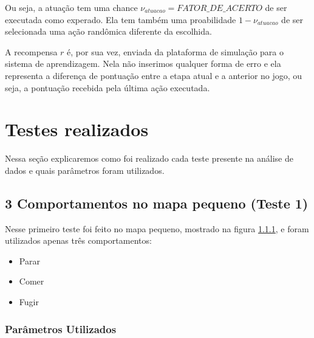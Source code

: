 Ou seja, a atuação tem uma chance $ \nu_{atuacao} = \textit{FATOR\_DE\_ACERTO} $ de ser executada como experado. Ela tem também uma proabilidade $ 1 - \nu_{atuacao} $ de ser selecionada uma ação randômica diferente da escolhida.

A recompensa $ r $ é, por sua vez, enviada da plataforma de simulação para o sistema de aprendizagem. Nela não inserimos qualquer forma de erro e ela representa a diferença de pontuação entre a etapa atual e a anterior no jogo, ou seja, a pontuação recebida pela última ação executada.


\section{Testes realizados} \label{section:TestesRealizados}

Nessa seção explicaremos como foi realizado cada teste presente na análise de dados e quais parâmetros foram utilizados.

\subsection{3 Comportamentos no mapa pequeno (Teste 1)}

Nesse primeiro teste foi feito no mapa pequeno, mostrado na figura \ref{}, e foram utilizados apenas três comportamentos:

\begin{itemize}
	\item Parar
	\item Comer
	\item Fugir
\end{itemize}

\subsubsection{Parâmetros Utilizados}

